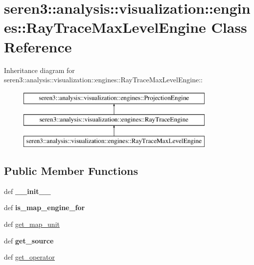 \hypertarget{classseren3_1_1analysis_1_1visualization_1_1engines_1_1RayTraceMaxLevelEngine}{
\section{seren3::analysis::visualization::engines::RayTraceMaxLevelEngine Class Reference}
\label{classseren3_1_1analysis_1_1visualization_1_1engines_1_1RayTraceMaxLevelEngine}
}
Inheritance diagram for seren3::analysis::visualization::engines::RayTraceMaxLevelEngine::\begin{figure}[H]
\begin{center}
\leavevmode
\includegraphics[height=3cm]{classseren3_1_1analysis_1_1visualization_1_1engines_1_1RayTraceMaxLevelEngine}
\end{center}
\end{figure}
\subsection*{Public Member Functions}
\begin{DoxyCompactItemize}
\item 
\hypertarget{classseren3_1_1analysis_1_1visualization_1_1engines_1_1RayTraceMaxLevelEngine_ac9f70fa12d8e23a8906aebfdcbd632e5}{
def {\bfseries \_\-\_\-init\_\-\_\-}}
\label{classseren3_1_1analysis_1_1visualization_1_1engines_1_1RayTraceMaxLevelEngine_ac9f70fa12d8e23a8906aebfdcbd632e5}

\item 
\hypertarget{classseren3_1_1analysis_1_1visualization_1_1engines_1_1RayTraceMaxLevelEngine_a7dfbabd034740bc79a45e8e3d29eef84}{
def {\bfseries is\_\-map\_\-engine\_\-for}}
\label{classseren3_1_1analysis_1_1visualization_1_1engines_1_1RayTraceMaxLevelEngine_a7dfbabd034740bc79a45e8e3d29eef84}

\item 
def \hyperlink{classseren3_1_1analysis_1_1visualization_1_1engines_1_1RayTraceMaxLevelEngine_ae614bc68c2ab9d2a68e8392175fc19e2}{get\_\-map\_\-unit}
\item 
\hypertarget{classseren3_1_1analysis_1_1visualization_1_1engines_1_1RayTraceMaxLevelEngine_ae5f4b238a75add616b828196eadebd07}{
def {\bfseries get\_\-source}}
\label{classseren3_1_1analysis_1_1visualization_1_1engines_1_1RayTraceMaxLevelEngine_ae5f4b238a75add616b828196eadebd07}

\item 
def \hyperlink{classseren3_1_1analysis_1_1visualization_1_1engines_1_1RayTraceMaxLevelEngine_a18ccb6602ed9e6ba18cbff8de2e6ad8c}{get\_\-operator}
\end{DoxyCompactItemize}


